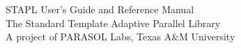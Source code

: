 \documentclass[letterpaper]{article}
\begin{document}
\begin{titlepage}
\vspace*{7cm}
\begin{center}
{\Huge STAPL User's Guide and Reference Manual}\\
\vspace*{1cm}
{\large The Standard Template Adaptive Parallel Library}\\
\vspace*{0.4cm}
{\large A project of PARASOL Labs, Texas A\&M University}
\end{center}
\end{titlepage}

\setcounter{tocdepth}{2}
\tableofcontents
\clearemptydoublepage
{}
\end{document}
